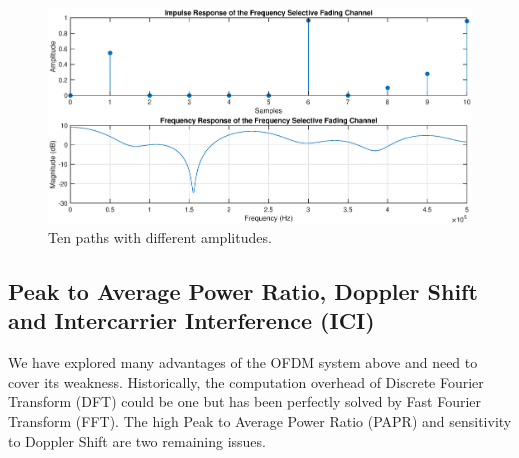 \begin{figure}[!htbp]
    \centering
    \includegraphics[width=\linewidth]{ffading.eps}
    \caption{Ten paths with different amplitudes.}
    \label{fig:ffading}
\end{figure}

\subsection{Peak to Average Power Ratio, Doppler Shift and Intercarrier Interference (ICI)}
We have explored many advantages of the OFDM system above and need to cover its weakness. Historically, the computation overhead of Discrete Fourier Transform (DFT) could be one but has been perfectly solved by Fast Fourier Transform (FFT). The high Peak to Average Power Ratio (PAPR) and sensitivity to Doppler Shift are two remaining issues.

